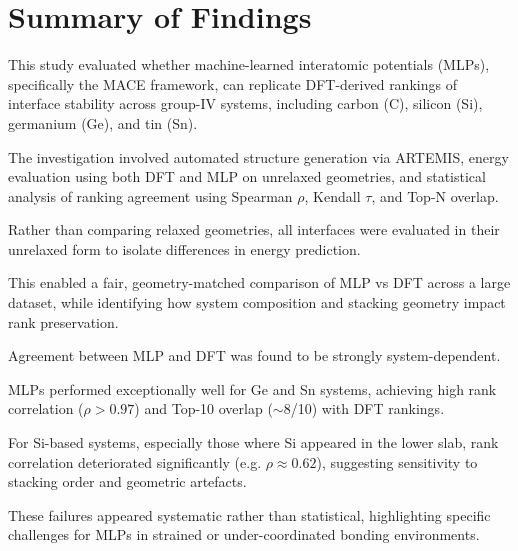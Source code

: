 \section{Summary of Findings} \label{section:summary_of_findings}


This study evaluated whether machine-learned interatomic potentials (MLPs), specifically the MACE framework, can
replicate DFT-derived rankings of interface stability across group-IV systems, including carbon (C), silicon (Si),
germanium (Ge), and tin (Sn).

The investigation involved automated structure generation via ARTEMIS, energy evaluation using both DFT and MLP on
unrelaxed geometries, and statistical analysis of ranking agreement using Spearman $\rho$, Kendall $\tau$, and Top-N
overlap.


Rather than comparing relaxed geometries, all interfaces were evaluated in their unrelaxed form to isolate differences
in energy prediction.

This enabled a fair, geometry-matched comparison of MLP vs DFT across a large dataset, while identifying how system
composition and stacking geometry impact rank preservation.


Agreement between MLP and DFT was found to be strongly system-dependent.

MLPs performed exceptionally well for Ge and Sn systems, achieving high rank correlation ($\rho > 0.97$) and Top-10
overlap ($\sim$8/10) with DFT rankings.

For Si-based systems, especially those where Si appeared in the lower slab, rank correlation deteriorated significantly
(e.g. $\rho \approx 0.62$), suggesting sensitivity to stacking order and geometric artefacts.

These failures appeared systematic rather than statistical, highlighting specific challenges for MLPs in strained or
under-coordinated bonding environments.




